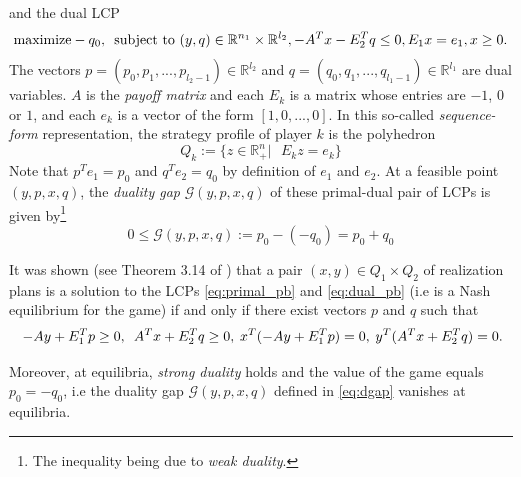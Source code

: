 \documentclass{article} %
\begin{document}
and the dual LCP
\begin{equation}
  \begin{aligned}
    \text{maximize}-q_0,\hspace{.5em}\text{subject to }(y,q) \in
    \mathbb{R}^{n_1} \times \mathbb{R}^{l_2}, -A^Tx - E_2^Tq \leq 0,
    E_1x = e_1, x \ge 0.
  \end{aligned}
  \label{eq:dual_pb}
\end{equation}
The vectors $p = (p_0, p_1, ..., p_{l_2 - 1}) \in \mathbb{R}^{l_2}$
and $q = (q_0, q_1, ..., q_{l_1 - 1}) \in \mathbb{R}^{l_1}$ are dual
variables. 
$A$ is the \textit{payoff matrix} and each $E_k$ is a matrix whose
entries are $-1$, $0$ or $1$, and each $e_k$ is a vector of the form
$[1, 0, ..., 0]$. In this so-called \textit{sequence-form}
representation, the strategy profile of player $k$ is the polyhedron
\begin{equation}
  Q_k := \{z \in \mathbb{R}^n_+ |\text{ }E_kz = e_k\}
\label{eq:polyhedron}
\end{equation}
Note that $p^Te_1 = p_0$ and $q^Te_2 = q_0$ by definition of $e_1$ and
$e_2$. At a feasible point $(y, p, x, q)$, the \textit{duality gap}
$\mathcal{G}(y, p, x, q)$ of these primal-dual pair of LCPs is given
by\footnote{The inequality being due to \textit{weak duality}.}
\begin{equation}
  0 \le \mathcal{G}(y, p, x, q) := p_0 - (-q_0) = p_0 + q_0
  \label{eq:dgap}
\end{equation}

It was shown (see Theorem 3.14 of \cite{vonequilibrium}) that a pair
$(x, y) \in Q_1 \times Q_2$ of realization plans is a solution to the
LCPs \eqref{eq:primal_pb} and \eqref{eq:dual_pb} (i.e is a Nash
equilibrium for the game)  if and only if there exist vectors $p$ and
$q$ such that
\begin{equation}
\hspace{.25em} -Ay + E_1^Tp \ge 0, \hspace{.5em}A^Tx + E_2^Tq \ge
0, \hspace{.25em} x^T(-Ay + E_1^Tp) = 0, \hspace{.25em} y^T(A^Tx +
E_2^Tq) = 0.
\label{eq:feasibility}
\end{equation}

Moreover, at equilibria, \textit{strong duality} holds and the value of the game equals $p_0 = -q_0$, i.e the duality gap $\mathcal{G}(y, p, x, q)$ defined in \eqref{eq:dgap} vanishes at equilibria.
\end{document}
